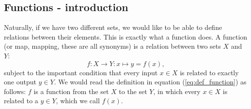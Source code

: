     \subsection{Functions - introduction}
        Naturally, if we have two different sets, we would like to be able to define relations between their elements. This is exactly what a function does. A function (or map, mapping, these are all synonyms) is a relation between two sets $X$ and $Y$:
        \begin{equation} \label{eq:def_function}
            f: X \rightarrow Y: x \mapsto y = f(x) ,
        \end{equation}
        subject to the important condition that every input $x \in X$ is related to exactly one output $y \in Y$. We would read the definition in equation (\ref{eq:def_function}) as follows: $f$ is a function from the set $X$ to the set $Y$, in which every $x \in X$ is related to a $y \in Y$, which we call $f(x)$. \\

